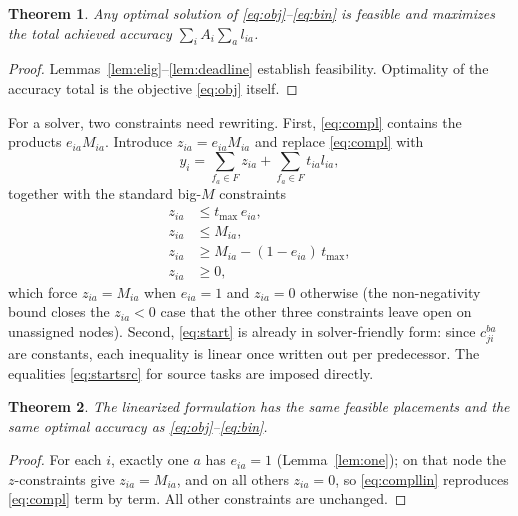 \documentclass[conference]{IEEEtran}
\newtheorem{theorem}{Theorem}
\begin{document}
\begin{theorem}
Any optimal solution of \eqref{eq:obj}--\eqref{eq:bin} is feasible and maximizes the total achieved accuracy $\sum_i A_i\sum_a l_{ia}$.
\end{theorem}
\begin{proof}
Lemmas~\ref{lem:elig}--\ref{lem:deadline} establish feasibility. Optimality of the accuracy total is the objective \eqref{eq:obj} itself.
\end{proof}

For a solver, two constraints need rewriting. First, \eqref{eq:compl} contains the products $e_{ia}M_{ia}$. Introduce $z_{ia}=e_{ia}M_{ia}$ and replace \eqref{eq:compl} with
\begin{equation}
 y_i=\sum_{f_a\in F} z_{ia}+\sum_{f_a\in F} t_{ia}l_{ia},
\label{eq:compllin}
\end{equation}
together with the standard big-$M$ constraints
\begin{align}
 z_{ia} &\le t_{\max}\, e_{ia},\\
 z_{ia} &\le M_{ia},\\
 z_{ia} &\ge M_{ia}-(1-e_{ia})\,t_{\max},\\
 z_{ia} &\ge 0,
\end{align}
which force $z_{ia}=M_{ia}$ when $e_{ia}=1$ and $z_{ia}=0$ otherwise (the
non-negativity bound closes the $z_{ia}<0$ case that the other three
constraints leave open on unassigned nodes). Second, \eqref{eq:start} is already in solver-friendly form: since $c_{ji}^{ba}$ are constants, each inequality is linear once written out per predecessor. The equalities \eqref{eq:startsrc} for source tasks are imposed directly.

\begin{theorem}
The linearized formulation has the same feasible placements and the same optimal accuracy as \eqref{eq:obj}--\eqref{eq:bin}.
\end{theorem}
\begin{proof}
For each $i$, exactly one $a$ has $e_{ia}=1$ (Lemma~\ref{lem:one}); on that node the $z$-constraints give $z_{ia}=M_{ia}$, and on all others $z_{ia}=0$, so \eqref{eq:compllin} reproduces \eqref{eq:compl} term by term. All other constraints are unchanged.
\end{proof}


\balance

\end{document}
